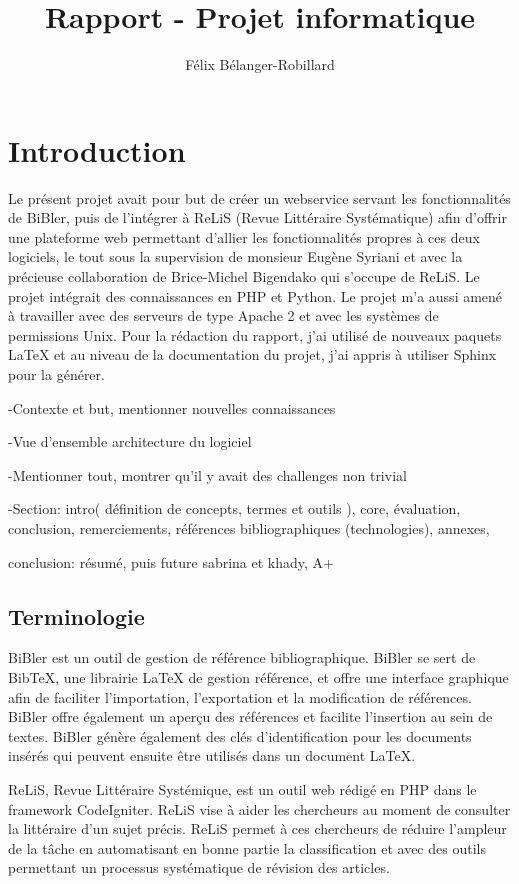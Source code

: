 \documentclass[a4paper,12pt,titlepage]{article}
\author{Félix Bélanger-Robillard}
\title{Rapport - Projet informatique}
\let\oldsection\section
\renewcommand\section{\clearpage\oldsection}
\begin{document}
\maketitle

\tableofcontents
\newpage

\section{Introduction}
Le présent projet avait pour but de créer un webservice servant les fonctionnalités de BiBler, puis de l'intégrer à ReLiS (Revue Littéraire Systématique) afin d'offrir une plateforme web permettant d'allier les fonctionnalités propres à ces deux logiciels, le tout sous la supervision de monsieur Eugène Syriani et avec la précieuse collaboration de Brice-Michel Bigendako qui s'occupe de ReLiS. Le projet intégrait des connaissances en PHP et Python. Le projet m'a aussi amené à travailler avec des serveurs de type Apache 2 et avec les systèmes de permissions Unix. Pour la rédaction du rapport, j'ai utilisé de nouveaux paquets LaTeX et au niveau de la documentation du projet, j'ai appris à utiliser Sphinx pour la générer.  \newline


-Contexte et but, mentionner nouvelles connaissances

-Vue d'ensemble architecture du logiciel

-Mentionner tout, montrer qu'il y avait des challenges non trivial

-Section: 
intro( définition de concepts, termes et outils ),
 core,
  évaluation,
   conclusion,
    remerciements,
     références bibliographiques (technologies),
      annexes, 

conclusion: résumé, puis future
sabrina et khady, A+
\subsection{Terminologie}
BiBler est un outil de gestion de référence bibliographique. BiBler se sert de BibTeX, une librairie LaTeX de gestion référence, et offre une interface graphique afin de faciliter l'importation, l'exportation et la modification de références. BiBler offre également un aperçu des références et facilite l'insertion au sein de textes. BiBler génère également des clés d'identification pour les documents insérés qui peuvent ensuite être utilisés dans un document LaTeX.  \newline

ReLiS, Revue Littéraire Systémique, est un outil web rédigé en PHP dans le framework CodeIgniter. ReLiS vise à aider les chercheurs au moment de consulter la littéraire d'un sujet précis. ReLiS permet à ces chercheurs de réduire l'ampleur de la tâche en automatisant en bonne partie la classification et avec des outils permettant un processus systématique de révision des articles. \newline
\end{document}
